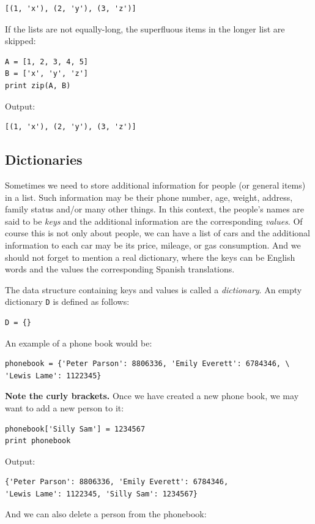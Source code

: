 \begin{verbatim}
[(1, 'x'), (2, 'y'), (3, 'z')]
\end{verbatim}
If the lists are not equally-long, the superfluous items in the longer list 
are skipped:

\begin{verbatim}
A = [1, 2, 3, 4, 5]
B = ['x', 'y', 'z']
print zip(A, B)
\end{verbatim}
Output:

\begin{verbatim}
[(1, 'x'), (2, 'y'), (3, 'z')]
\end{verbatim}

\subsection{Dictionaries}

Sometimes we need to store additional information for 
people (or general items) in a list. Such information may be  
their phone number, age, weight, address, family 
status and/or many other things. In this context, the 
people's names are said to be {\em keys} and the additional 
information are the corresponding {\em values}. Of course this 
is not only about people, we can have a list of cars and the 
additional information to each car may be its price, mileage, or
gas consumption. And we should not forget to mention a real 
dictionary, where the keys can be English words and the values the 
corresponding Spanish translations.

The data structure containing keys and values is called a {\em dictionary}. 
An empty dictionary {\tt D} is defined as follows:

\begin{verbatim}
D = {}
\end{verbatim}
An example of a phone book would be:

\begin{verbatim}
phonebook = {'Peter Parson': 8806336, 'Emily Everett': 6784346, \
'Lewis Lame': 1122345}
\end{verbatim}
{\bf Note the curly brackets.} 
Once we have created a new phone book, we may want to add a new person to it:

\begin{verbatim}
phonebook['Silly Sam'] = 1234567
print phonebook
\end{verbatim}
Output:

\begin{verbatim}
{'Peter Parson': 8806336, 'Emily Everett': 6784346,
'Lewis Lame': 1122345, 'Silly Sam': 1234567}
\end{verbatim}
And we can also delete a person from the phonebook:

